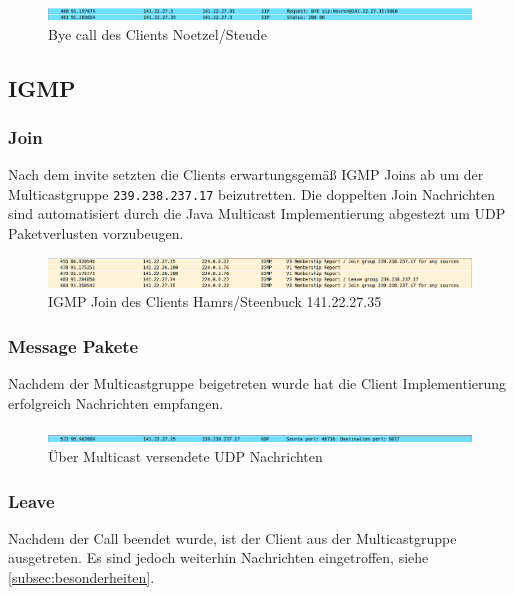 \documentclass[10pt]{scrartcl}
\begin{document}
	\begin{figure}[htb]
        \centering
         \includegraphics[width=\textwidth]{img/bye}
         \caption{Bye call des Clients Noetzel/Steude}
        \label{img:byes}
	\end{figure}		
	

\subsection{IGMP}

	\subsubsection{Join}
	Nach dem invite setzten die Clients erwartungsgemäß IGMP Joins ab um der Multicastgruppe \verb!239.238.237.17! beizutretten. Die doppelten Join Nachrichten sind automatisiert durch die Java Multicast Implementierung abgestezt um UDP Paketverlusten vorzubeugen.
	
	\begin{figure}[htb]
        \centering
         \includegraphics[width=\textwidth]{img/join}
         \caption{IGMP Join des Clients Hamrs/Steenbuck 141.22.27.35}
        \label{img:join}
	\end{figure}	

	
	\subsubsection{Message Pakete}
	Nachdem der Multicastgruppe	beigetreten wurde hat die Client Implementierung erfolgreich Nachrichten empfangen. 
	
	\begin{figure}[htb]
        \centering
         \includegraphics[width=\textwidth]{img/udpMessage}
         \caption{Über Multicast versendete UDP Nachrichten}
        \label{img:udpMessage}
	\end{figure}	
	
	\subsubsection{Leave}
	Nachdem der Call beendet wurde, ist der Client aus der Multicastgruppe ausgetreten. Es sind jedoch weiterhin Nachrichten eingetroffen, siehe \ref{subsec:besonderheiten}.
	
\end{document}
